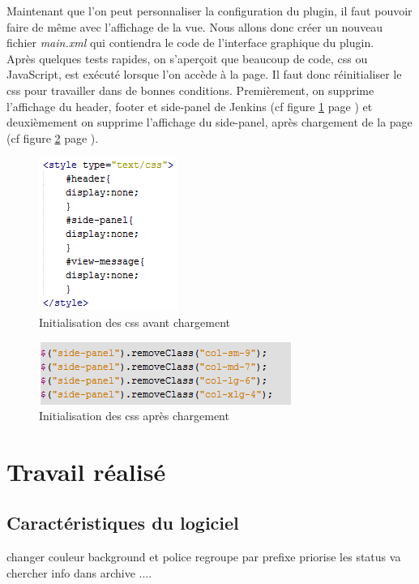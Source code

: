 Maintenant que l'on peut personnaliser la configuration du plugin, il faut pouvoir faire de même avec l'affichage de la vue. Nous allons donc créer un nouveau fichier \emph{main.xml} qui contiendra le code de l'interface graphique du plugin.\\

Après quelques tests rapides, on s'aperçoit que beaucoup de code, css ou JavaScript, est exécuté lorsque l'on accède à la page. Il faut donc réinitialiser le css pour travailler dans de bonnes conditions. Premièrement, on supprime l'affichage du header, footer et side-panel de Jenkins (cf figure \ref{figure:cssInit} page \pageref{figure:cssInit}) et deuxièmement on supprime l'affichage du side-panel, après chargement de la page (cf figure \ref{figure:cssInitJS} page \pageref{figure:cssInitJS}).\\

\begin{figure}[!h]
  \centering
      \includegraphics{images/cssInit.png}
  \caption{Initialisation des css avant chargement}
	\label{figure:cssInit}
\end{figure}

\begin{figure}[!h]
  \centering
      \includegraphics{images/cssInitJS.png}
  \caption{Initialisation des css après chargement}
	\label{figure:cssInitJS}
\end{figure}


\section{Travail réalisé}

\subsection{Caractéristiques du logiciel}%
changer couleur background et police
regroupe par prefixe
priorise les status
va chercher info dans archive
....




